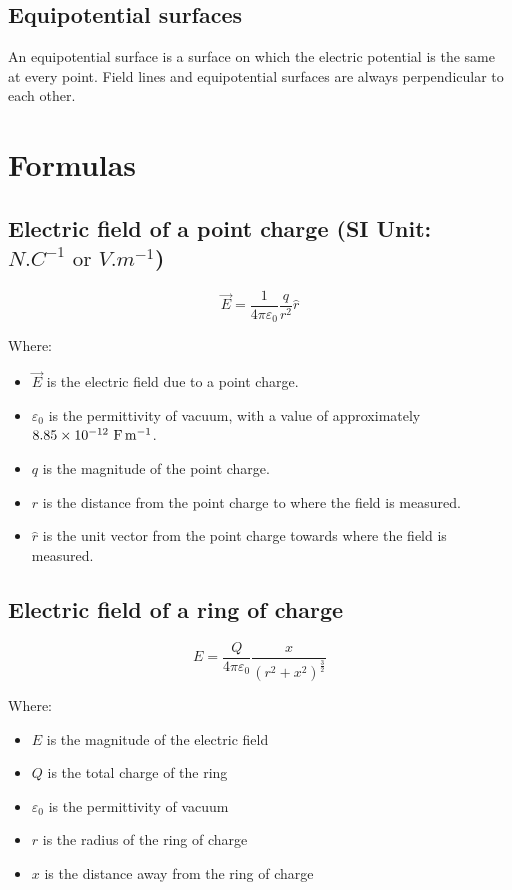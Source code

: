 \documentclass[11pt]{article}
\begin{document}
\subsection{Equipotential surfaces}
\label{sec:orgc3564f2}
An equipotential surface is a surface on which the electric potential is the same at every point. Field lines and equipotential surfaces are always perpendicular to each other.

\newpage

\section{Formulas}
\label{sec:org0babc58}

\subsection{Electric field of a point charge (SI Unit: \(\unit{N.C^{-1}} \text{ or } \unit{V.m^{-1}}\))}
\label{sec:org9601dc2}

\[\vec{E} = \frac{1}{4 \pi \varepsilon_0} \frac{q}{r^2} \hat{r}\]

Where:
\begin{itemize}
\item \(\vec{E}\) is the electric field due to a point charge.
\item \(\varepsilon_0\) is the permittivity of vacuum, with a value of approximately \(\\ 8.85 \times 10^{-12} \ \unit{F.m^{-1}}\).
\item \(q\) is the magnitude of the point charge.
\item \(r\) is the distance from the point charge to where the field is measured.
\item \(\hat{r}\) is the unit vector from the point charge towards where the field is measured.
\end{itemize}

\subsection{Electric field of a ring of charge}
\label{sec:org3d38aa6}
\[E = \frac{Q}{4 \pi \varepsilon_0} \frac{x}{(r^2 + x^2)^{\frac{3}{2}}}\]

Where:
\begin{itemize}
\item \(E\) is the magnitude of the electric field
\item \(Q\) is the total charge of the ring
\item \(\varepsilon_0\) is the permittivity of vacuum
\item \(r\) is the radius of the ring of charge
\item \(x\) is the distance away from the ring of charge
\end{itemize}
\end{document}
